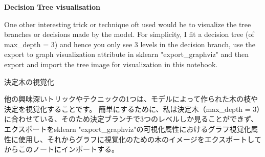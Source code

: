 \documentclass[11pt]{article}
\begin{document}
    
    
    \textbf{Decision Tree visualisation}

One other interesting trick or technique oft used would be to visualize
the tree branches or decisions made by the model. For simplicity, I fit
a decision tree (of max\_depth = 3) and hence you only see 3 levels in
the decision branch, use the export to graph visualization attribute in
sklearn "export\_graphviz" and then export and import the tree image for
visualization in this notebook.

    決定木の視覚化

他の興味深いトリックやテクニックの1つは、モデルによって作られた木の枝や決定を視覚化することです。
簡単にするために、私は決定木（max\_depth =
3）に合わせている、そのため決定ブランチで3つのレベルしか見ることができず、エクスポートをsklearn
"export\_graphviz"の可視化属性におけるグラフ視覚化属性に使用し、それからグラフに視覚化のための木のイメージをエクスポートしてからこのノートにインポートする。
\end{document}
